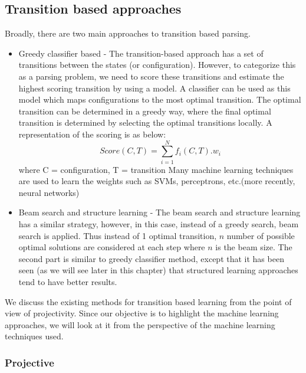 \subsection{Transition based approaches}

Broadly, there are two main approaches to transition based parsing. 

\begin{itemize}
\item Greedy classifier based - The transition-based approach has a set of transitions between the states (or configuration). However, to categorize this as a parsing problem, we need to score these transitions and estimate the highest scoring transition by using a model. A classifier can be used as this model which maps configurations to the most optimal transition. The optimal transition can be determined in a greedy way, where the final optimal transition is determined by selecting the optimal transitions locally. A representation of the scoring is as below:
\begin{equation*}
Score(C, T) = \sum_{i = 1}^{N} f_i(C,T).w_i
\end{equation*}
where C = configuration, T = transition
Many machine learning techniques are used to learn the weights such as SVMs, perceptrons, etc.(more recently, neural networks)

\item Beam search and structure learning - The beam search and structure learning has a similar strategy, however, in this case, instead of a greedy search, beam search is applied. Thus instead of 1 optimal transition, $n$ number of possible optimal solutions are considered at each step where $n$ is the beam size. The second part is similar to greedy classifier method, except that it has been seen (as we will see later in this chapter) that structured learning approaches tend to have better results.
\end{itemize}

We discuss the existing methods for transition based learning from the point of view of projectivity. Since our objective is to highlight the machine learning approaches, we will look at it from the perspective of the machine learning techniques used.

\subsubsection{Projective}

